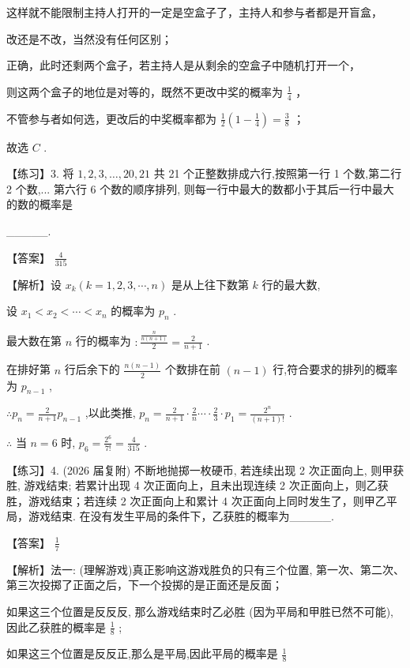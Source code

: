 \documentclass[10pt]{article}
\newcommand*\circled[1]{\tikz[baseline=(char.base)]{\node[shape=circle,draw,inner sep=1.5pt] (char) {\small #1};}}
\begin{document}
这样就不能限制主持人打开的一定是空盒子了，主持人和参与者都是开盲盒，

改还是不改，当然没有任何区别；

 \circled{2} 正确，此时还剩两个盒子，若主持人是从剩余的空盒子中随机打开一个，

则这两个盒子的地位是对等的，既然不更改中奖的概率为 \(\frac{1}{4}\) ，

不管参与者如何选，更改后的中奖概率都为 \(\frac{1}{2}\left( {1 - \frac{1}{4}}\right)  = \frac{3}{8}\) ；

故选 \(C\) .

【练习】3. 将 \(1,2,3,\ldots ,{20},{21}\) 共 21 个正整数排成六行,按照第一行 1 个数,第二行 2 个数,... 第六行 6 个数的顺序排列, 则每一行中最大的数都小于其后一行中最大的数的概率是

\_\_\_\_\_.

【答案】 \(\frac{4}{315}\)

【解析】设 \({x}_{k}\left( {k = 1,2,3,\cdots ,n}\right)\) 是从上往下数第 \(k\) 行的最大数,

设 \({x}_{1} < {x}_{2} < \cdots  < {x}_{n}\) 的概率为 \({p}_{n}\) .

最大数在第 \(n\) 行的概率为 \(: \frac{\frac{n}{n\left( {n + 1}\right) }}{2} = \frac{2}{n + 1}\) .

在排好第 \(n\) 行后余下的 \(\frac{n\left( {n - 1}\right) }{2}\) 个数排在前 \(\left( {n - 1}\right)\) 行,符合要求的排列的概率为 \({p}_{n - 1}\) ,

\(\therefore {p}_{n} = \frac{2}{n + 1}{p}_{n - 1}\) ,以此类推, \({p}_{n} = \frac{2}{n + 1} \cdot  \frac{2}{n}\cdots  \cdot  \frac{2}{3} \cdot  {p}_{1} = \frac{{2}^{n}}{\left( {n + 1}\right) !}\) .

\(\therefore\) 当 \(n = 6\) 时, \({p}_{6} = \frac{{2}^{6}}{7!} = \frac{4}{315}\) .

【练习】4. (2026 届复附) 不断地抛掷一枚硬币, 若连续出现 2 次正面向上, 则甲获胜, 游戏结束; 若累计出现 4 次正面向上，且未出现连续 2 次正面向上，则乙获胜，游戏结束；若连续 2 次正面向上和累计 4 次正面向上同时发生了，则甲乙平局，游戏结束. 在没有发生平局的条件下，乙获胜的概率为\_\_\_\_\_.

【答案】 \(\frac{1}{7}\)

【解析】法一: (理解游戏)真正影响这游戏胜负的只有三个位置, 第一次、第二次、第三次投掷了正面之后，下一个投掷的是正面还是反面；

如果这三个位置是反反反, 那么游戏结束时乙必胜 (因为平局和甲胜已然不可能), 因此乙获胜的概率是 \(\frac{1}{8}\) ;

如果这三个位置是反反正,那么是平局,因此平局的概率是 \(\frac{1}{8}\)
\end{document}
